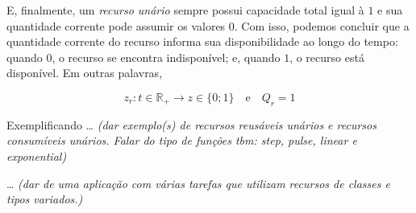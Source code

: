         E, finalmente, um \textit{recurso unário} sempre possui capacidade total igual à $1$ e sua quantidade corrente pode assumir os valores $0$. Com isso, podemos concluir que a quantidade corrente do recurso informa sua disponibilidade ao longo do tempo: quando $0$, o recurso se encontra indisponível; e, quando $1$, o recurso está disponível. Em outras palavras,
        
        \begin{equation} \label{eq:recurso_unario}
            z_r: t \in \mathbb{R}_+ \to z \in \{0; 1\} 
            \quad\text{e}\quad
            Q_r = 1
        \end{equation}
        
        Exemplificando \dots \emph{\color{red} (dar exemplo(s) de recursos reusáveis unários e recursos consumíveis unários. Falar do tipo de funções tbm: \textit{step}, \textit{pulse}, \textit{linear} e \textit{exponential})}
        
        \dots \emph{\color{red} (dar de uma aplicação com várias tarefas que utilizam recursos de classes e tipos variados.)}
